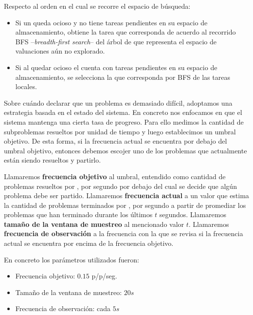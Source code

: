 Respecto al orden en el cual se recorre el espacio de búsqueda:

\begin{itemize}
	\item Si un \w queda ocioso y no tiene tareas pendientes en su espacio de almacenamiento, obtiene la tarea que corresponda de acuerdo al recorrido BFS --\emph{breadth-first search}-- del árbol de que representa el espacio de valuaciones aún no explorado.
	\item Si al quedar ocioso el \w cuenta con tareas pendientes en su espacio de almacenamiento, se selecciona la que corresponda por BFS de las tareas locales.
\end{itemize}

Sobre cuándo declarar que un problema es demasiado difícil, adoptamos una
estrategia basada en el estado del sistema. En concreto nos enfocamos en que
el sistema mantenga una cierta tasa de progreso. Para ello medimos la cantidad
de subproblemas resueltos por unidad de tiempo y luego establecimos un umbral
objetivo. De esta forma, si la frecuencia actual se encuentra por debajo del umbral
objetivo, entonces debemos escojer uno de los problemas que actualmente están
siendo resueltos y partirlo.

Llamaremos \textbf{frecuencia objetivo} al umbral, entendido como 
cantidad de problemas resueltos por \w, por segundo por debajo del cual se decide que algún
problema debe ser partido. Llamaremos \textbf{frecuencia actual} a un valor
que estima la cantidad de problemas terminados por \w, por segundo a partir de
promediar los problemas que han terminado durante los últimos $t$ segundos.
Llamaremos \textbf{tamaño de la ventana de muestreo} al mencionado valor $t$.
Llamaremos \textbf{frecuencia de observación} a la frecuencia con la que se revisa
si la frecuencia actual se encuentra por encima de la frecuencia objetivo.

En concreto los parámetros utilizados fueron:

\begin{itemize}
	\item Frecuencia objetivo: $0.15$ p/\w p/seg.
	\item Tamaño de la ventana de muestreo: $20s$
	\item Frecuencia de observación: cada $5s$
\end{itemize}

